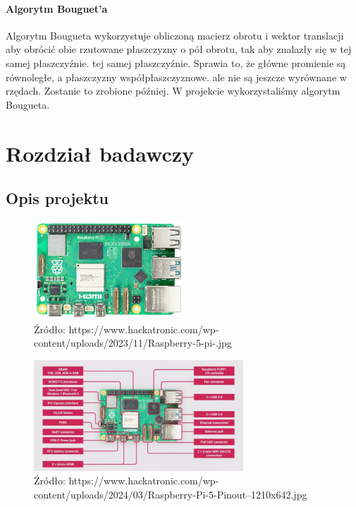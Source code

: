 \documentclass[magisterska]{pracadypl}
\begin{document}
\subsubsection{Algorytm Bouguet'a}

Algorytm Bougueta wykorzystuje obliczoną macierz obrotu i wektor translacji
aby obrócić obie rzutowane płaszczyzny o pół obrotu, tak aby znalazły się w tej samej płaszczyźnie.
tej samej płaszczyźnie. Sprawia to, że główne promienie są równoległe, a płaszczyzny współpłaszczyznowe.
ale nie są jeszcze wyrównane w rzędach. Zostanie to zrobione później.
W projekcie wykorzystaliśmy algorytm Bougueta.

\chapter{Rozdział badawczy}

\section{Opis projektu}

\begin{figure}[h]  %
    \centering  %
    \includegraphics[width=0.5\textwidth]{images/RPI.jpg}  %
    \captionsetup{labelformat=empty, font=footnotesize}
    \caption{Źródło: https://www.hackatronic.com/wp-content/uploads/2023/11/Raspberry-5-pi-.jpg}
    \label{fig:rpi}  %
\end{figure}

\begin{figure}[h]  %
    \centering  %
    \includegraphics[width=0.7\textwidth]{images/RPI-SPEC.jpg}  %
    \captionsetup{labelformat=empty, font=footnotesize}
    \caption{Źródło: https://www.hackatronic.com/wp-content/uploads/2024/03/Raspberry-Pi-5-Pinout--1210x642.jpg}
    \label{fig:rpi-spec}  %
\end{figure}
\end{document}
